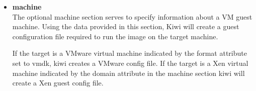 \begin{itemize}
	\begin{Command}{12cm}
	<split>\\
	\hspace*{1cm}<temporary>\\
	\hspace*{2cm}<!-- read/write access to: -->\\
	\hspace*{2cm}<file name="/var"/>\\
	\hspace*{2cm}<file name="/var/*"/>\\
	\hspace*{2cm}<!-- but not on this file: -->\\
	\hspace*{2cm}<except name="/etc/shadow"/>\\
	\hspace*{1cm}</temporary>\\
	\hspace*{1cm}<persistent>\\
	\hspace*{2cm}<!-- persistent read/write access to: -->\\
	\hspace*{2cm}<file name="/etc"/>\\
	\hspace*{2cm}<file name="/etc/*"/>\\
	\hspace*{2cm}<!-- but not on this file: -->\\
	\hspace*{2cm}<except name="/etc/passwd"/>\\
	\hspace*{1cm}</persistent>\\
	</split>
	\end{Command}

    Use the \textbf{except} element to specify exceptions to previously
    configured rules.

\item \textbf{machine}\\
    The optional machine section serves to specify information
    about a VM guest machine. Using the data provided in this section,
    Kiwi will create a guest configuration file required to run the
    image on the target machine.

    If the target is a VMware virtual machine indicated by the
    format attribute set to vmdk, kiwi creates a VMware config file.
    If the target is a Xen virtual machine indicated by the domain
    attribute in the machine section kiwi will create a Xen guest
    config file.


\end{itemize}
